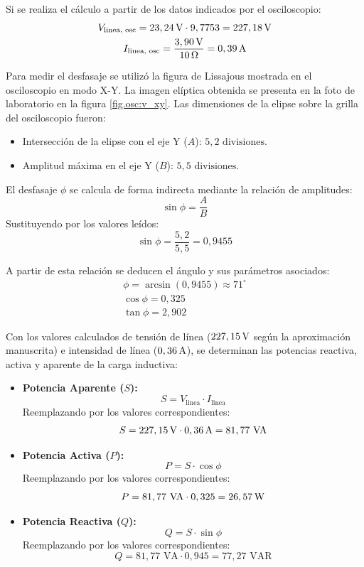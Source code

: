 Si se realiza el cálculo a partir de los datos indicados por el osciloscopio:
\begin{gather*}
    V_{\text{linea, osc}} = 23,24\,\mathrm{V} \cdot 9,7753 = 227,18\,\mathrm{V} \\
    I_{\text{linea, osc}} = \frac{3,90\,\mathrm{V}}{10\,\Omega} = 0,39\,\mathrm{A}
\end{gather*}

Para medir el desfasaje se utilizó la figura de Lissajous mostrada en el osciloscopio en modo X-Y. La imagen elíptica
obtenida se presenta en la foto de laboratorio en la figura \ref{fig.osc:v_xy}. Las dimensiones de la elipse sobre la
grilla del osciloscopio fueron:
\begin{itemize}
    \item Intersección de la elipse con el eje Y ($A$): $5,2\text{ divisiones}$.
    \item Amplitud máxima en el eje Y ($B$): $5,5\text{ divisiones}$.
\end{itemize}

El desfasaje $\phi$ se calcula de forma indirecta mediante la relación de amplitudes:
\begin{equation}
    \sin\phi = \frac{A}{B}
\end{equation}
Sustituyendo por los valores leídos:
\[ \sin\phi = \frac{5,2}{5,5} = 0,9455 \]

A partir de esta relación se deducen el ángulo y sus parámetros asociados:
\begin{gather*}
    \phi = \arcsin(0,9455) \approx 71^\circ \\
    \cos\phi = 0,325 \\
    \tan\phi = 2,902
\end{gather*}

Con los valores calculados de tensión de línea ($227,15\,\mathrm{V}$ según la aproximación manuscrita) e intensidad de línea
($0,36\,\mathrm{A}$), se determinan las potencias reactiva, activa y aparente de la carga inductiva:
\begin{itemize}
    \item \textbf{Potencia Aparente ($S$):}
          \begin{equation}
              S = V_{\text{linea}} \cdot I_{\text{linea}}
          \end{equation}
          Reemplazando por los valores correspondientes:
          \[ S = 227,15\,\mathrm{V} \cdot 0,36\,\mathrm{A} = 81,77\text{ VA} \]
    \item \textbf{Potencia Activa ($P$):}
          \begin{equation}
              P = S \cdot \cos\phi
          \end{equation}
          Reemplazando por los valores correspondientes:
          \[ P = 81,77\text{ VA} \cdot 0,325 = 26,57\,\mathrm{W} \]
    \item \textbf{Potencia Reactiva ($Q$):}
          \begin{equation}
              Q = S \cdot \sin\phi
          \end{equation}
          Reemplazando por los valores correspondientes:
          \[ Q = 81,77\text{ VA} \cdot 0,945 = 77,27\text{ VAR} \]
\end{itemize}


